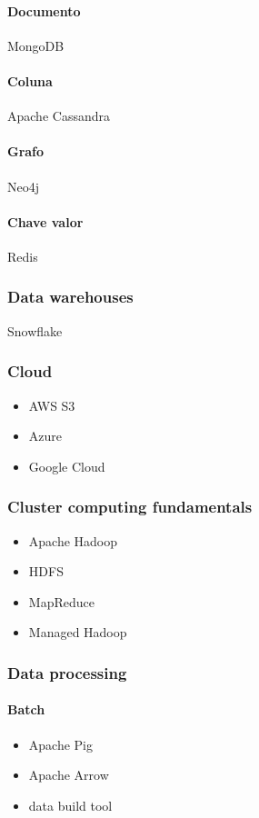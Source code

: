 \paragraph*{Documento} 
MongoDB

\paragraph*{Coluna}
Apache Cassandra

\paragraph*{Grafo}
Neo4j

\paragraph*{Chave valor}
Redis

\subsubsection*{Data warehouses} 
Snowflake

\subsubsection*{Cloud}
\begin{itemize}
	\item AWS S3
	\item Azure
	\item Google Cloud
\end{itemize}


\subsubsection*{Cluster computing fundamentals}
\begin{itemize}
	\item Apache Hadoop
	\item HDFS
	\item MapReduce
	\item Managed Hadoop
\end{itemize}


\subsubsection*{Data processing}
\paragraph*{Batch}
\begin{itemize}
	\item Apache Pig 
	\item Apache Arrow
	\item data build tool
\end{itemize}

